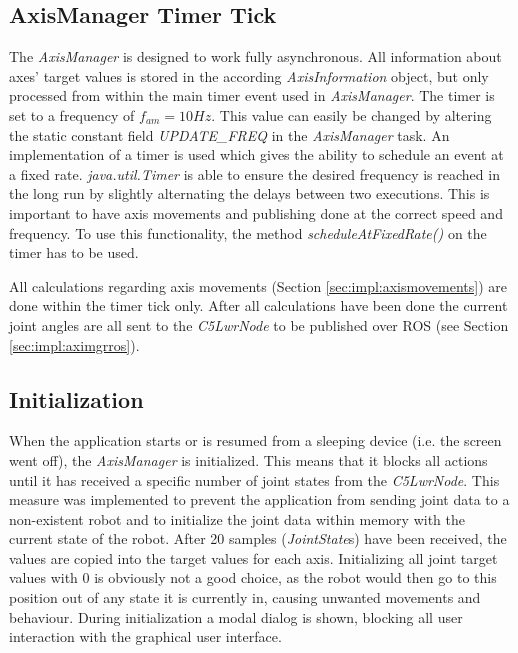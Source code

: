 \subsection{AxisManager Timer Tick}

The \textit{AxisManager} is designed to work fully asynchronous. All information about axes' target values is stored in the according \textit{AxisInformation} object, but only processed from within the main timer event used in \textit{AxisManager}. The timer is set to a frequency of $f_{am} = 10Hz$. This value can easily be changed by altering the static constant field \textit{UPDATE\_FREQ} in the \textit{AxisManager} task. An implementation of a timer is used which gives the ability to schedule an event at a fixed rate. \textit{java.util.Timer} is able to ensure the desired frequency is reached in the long run by slightly alternating the delays between two executions\cite{AndroidTimer2018}. This is important to have axis movements and publishing done at the correct speed and frequency. To use this functionality, the method \textit{scheduleAtFixedRate()} on the timer has to be used. 

All calculations regarding axis movements (Section \ref{sec:impl:axismovements}) are done within the timer tick only. After all calculations have been done the current joint angles are all sent to the \textit{C5LwrNode} to be published over ROS (see Section \ref{sec:impl:aximgrros}).

\subsection{Initialization}

When the application starts or is resumed from a sleeping device (i.e. the screen went off), the \textit{AxisManager} is initialized. This means that it blocks all actions until it has received a specific number of joint states from the \textit{C5LwrNode}. This measure was implemented to prevent the application from sending joint data to a non-existent robot and to initialize the joint data within memory with the current state of the robot. After 20 samples (\textit{JointState}s) have been received, the values are copied into the target values for each axis.
Initializing all joint target values with 0 is obviously not a good choice, as the robot would then go to this position out of any state it is currently in, causing unwanted movements and behaviour. During initialization a modal dialog is shown, blocking all user interaction with the graphical user interface.

